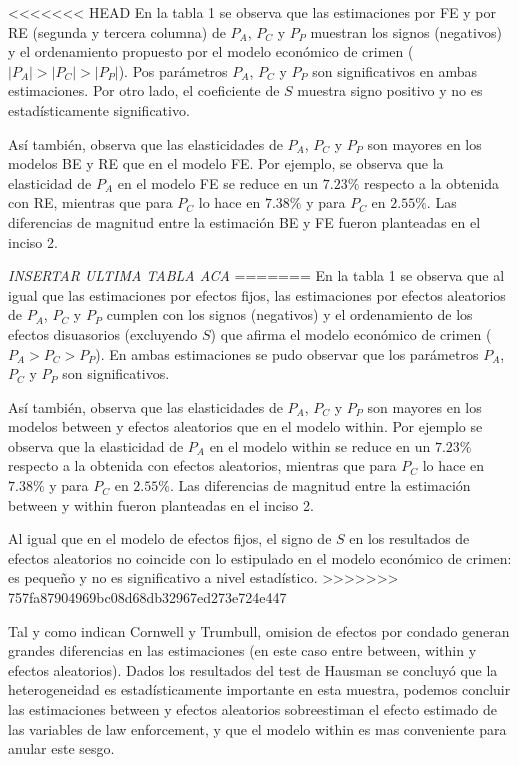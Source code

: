 \documentclass[
]{article}
\begin{document}
<<<<<<< HEAD
En la tabla 1 se observa que las estimaciones por FE y por RE (segunda y
tercera columna) de \(P_A\), \(P_C\) y \(P_P\) muestran los signos
(negativos) y el ordenamiento propuesto por el modelo económico de
crimen (\(|P_A|>|P_C|>|P_P|\)). Pos parámetros \(P_A\), \(P_C\) y
\(P_P\) son significativos en ambas estimaciones. Por otro lado, el
coeficiente de \(S\) muestra signo positivo y no es estadísticamente
significativo.

Así también, observa que las elasticidades de \(P_A\), \(P_C\) y \(P_P\)
son mayores en los modelos BE y RE que en el modelo FE. Por ejemplo, se
observa que la elasticidad de \(P_A\) en el modelo FE se reduce en un
\(7.23\%\) respecto a la obtenida con RE, mientras que para \(P_C\) lo
hace en \(7.38\%\) y para \(P_C\) en \(2.55\%\). Las diferencias de
magnitud entre la estimación BE y FE fueron planteadas en el inciso 2.

\emph{INSERTAR ULTIMA TABLA ACA}
=======
En la tabla 1 se observa que al igual que las estimaciones por efectos
fijos, las estimaciones por efectos aleatorios de \(P_A\), \(P_C\) y
\(P_P\) cumplen con los signos (negativos) y el ordenamiento de los
efectos disuasorios (excluyendo \(S\)) que afirma el modelo económico de
crimen (\(P_A>P_C>P_P\)). En ambas estimaciones se pudo observar que los
parámetros \(P_A\), \(P_C\) y \(P_P\) son significativos.

Así también, observa que las elasticidades de \(P_A\), \(P_C\) y \(P_P\)
son mayores en los modelos between y efectos aleatorios que en el modelo
within. Por ejemplo se observa que la elasticidad de \(P_A\) en el
modelo within se reduce en un \(7.23\%\) respecto a la obtenida con
efectos aleatorios, mientras que para \(P_C\) lo hace en \(7.38\%\) y
para \(P_C\) en \(2.55\%\). Las diferencias de magnitud entre la
estimación between y within fueron planteadas en el inciso 2.

Al igual que en el modelo de efectos fijos, el signo de \(S\) en los
resultados de efectos aleatorios no coincide con lo estipulado en el
modelo económico de crimen: es pequeño y no es significativo a nivel
estadístico.
>>>>>>> 757fa87904969bc08d68db32967ed273e724e447

Tal y como indican Cornwell y Trumbull, omision de efectos por condado
generan grandes diferencias en las estimaciones (en este caso entre
between, within y efectos aleatorios). Dados los resultados del test de
Hausman se concluyó que la heterogeneidad es estadísticamente importante
en esta muestra, podemos concluir las estimaciones between y efectos
aleatorios sobreestiman el efecto estimado de las variables de law
enforcement, y que el modelo within es mas conveniente para anular este
sesgo.
\end{document}
